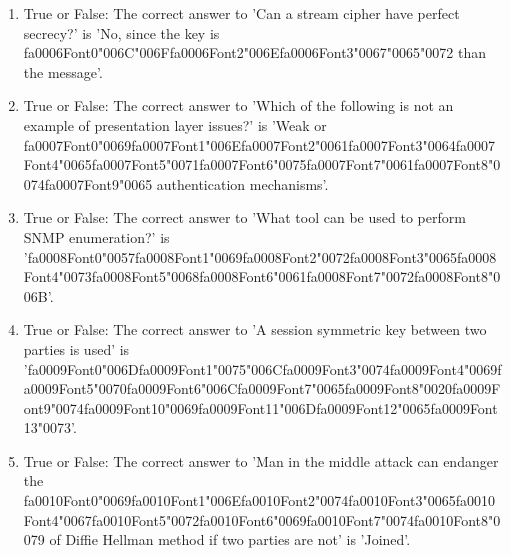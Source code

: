 \documentclass[12pt]{article}
\begin{document}
\begin{enumerate}[label=\arabic*.]
\item True or False: The correct answer to 'Can a stream cipher have perfect secrecy?' is 'No, since the key is {\csname fa0006Font0\endcsname\char"006C}{\char"006F}{\csname fa0006Font2\endcsname\char"006E}{\csname fa0006Font3\endcsname\char"0067}{\char"0065}{\char"0072} than the message'.
\item True or False: The correct answer to 'Which of the following is not an example of presentation layer issues?' is 'Weak or {\csname fa0007Font0\endcsname\char"0069}{\csname fa0007Font1\endcsname\char"006E}{\csname fa0007Font2\endcsname\char"0061}{\csname fa0007Font3\endcsname\char"0064}{\csname fa0007Font4\endcsname\char"0065}{\csname fa0007Font5\endcsname\char"0071}{\csname fa0007Font6\endcsname\char"0075}{\csname fa0007Font7\endcsname\char"0061}{\csname fa0007Font8\endcsname\char"0074}{\csname fa0007Font9\endcsname\char"0065} authentication mechanisms'.
\item True or False: The correct answer to 'What tool can be used to perform SNMP enumeration?' is '{\csname fa0008Font0\endcsname\char"0057}{\csname fa0008Font1\endcsname\char"0069}{\csname fa0008Font2\endcsname\char"0072}{\csname fa0008Font3\endcsname\char"0065}{\csname fa0008Font4\endcsname\char"0073}{\csname fa0008Font5\endcsname\char"0068}{\csname fa0008Font6\endcsname\char"0061}{\csname fa0008Font7\endcsname\char"0072}{\csname fa0008Font8\endcsname\char"006B}'.
\item True or False: The correct answer to 'A session symmetric key between two parties is used' is '{\csname fa0009Font0\endcsname\char"006D}{\csname fa0009Font1\endcsname\char"0075}{\char"006C}{\csname fa0009Font3\endcsname\char"0074}{\csname fa0009Font4\endcsname\char"0069}{\csname fa0009Font5\endcsname\char"0070}{\csname fa0009Font6\endcsname\char"006C}{\csname fa0009Font7\endcsname\char"0065}{\csname fa0009Font8\endcsname\char"0020}{\csname fa0009Font9\endcsname\char"0074}{\csname fa0009Font10\endcsname\char"0069}{\csname fa0009Font11\endcsname\char"006D}{\csname fa0009Font12\endcsname\char"0065}{\csname fa0009Font13\endcsname\char"0073}'.
\item True or False: The correct answer to 'Man in the middle attack can endanger the {\csname fa0010Font0\endcsname\char"0069}{\csname fa0010Font1\endcsname\char"006E}{\csname fa0010Font2\endcsname\char"0074}{\csname fa0010Font3\endcsname\char"0065}{\csname fa0010Font4\endcsname\char"0067}{\csname fa0010Font5\endcsname\char"0072}{\csname fa0010Font6\endcsname\char"0069}{\csname fa0010Font7\endcsname\char"0074}{\csname fa0010Font8\endcsname\char"0079} of Diffie Hellman method if two parties are not' is 'Joined'.

\end{enumerate}
\end{document}
